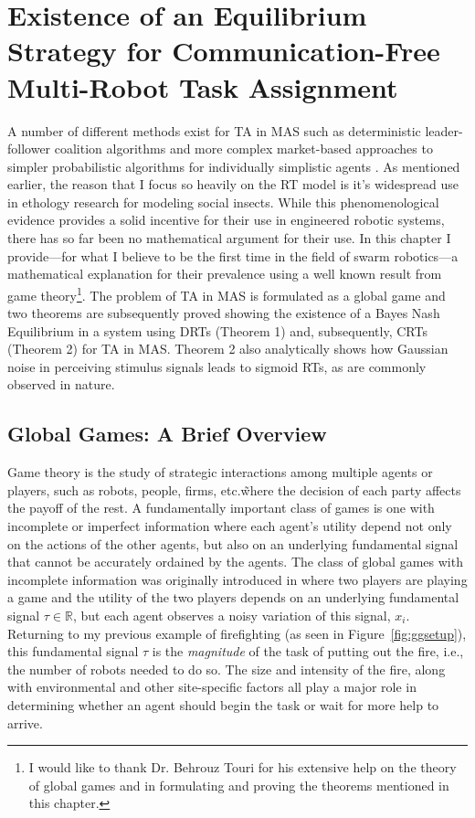 \documentclass[defaultstyle,12pt]{thesis}
\begin{document}
\chapter{Existence of an Equilibrium Strategy for Communication-Free Multi-Robot Task Assignment}\label{ch:existeqrtm}
A number of different methods exist for TA in MAS such as deterministic leader-follower coalition algorithms \cite{Chen2011} and more complex market-based approaches \cite{Amstutz2008} to simpler probabilistic algorithms for individually simplistic agents \cite{Dantu2012}. As mentioned earlier, the reason that I focus so heavily on the RT model is it's widespread use in ethology research for modeling social insects. While this phenomenological evidence provides a solid incentive for their use in engineered robotic systems, there has so far been no mathematical argument for their use. In this chapter I provide---for what I believe to be the first time in the field of swarm robotics---a mathematical explanation for their prevalence using a well known result from game theory\footnote{I would like to thank Dr. Behrouz Touri for his extensive help on the theory of global games and in formulating and proving the theorems mentioned in this chapter.}. The problem of TA in MAS is formulated as a global game and two theorems are subsequently proved showing the existence of a Bayes Nash Equilibrium in a system using DRTs (Theorem 1) and, subsequently, CRTs (Theorem 2) for TA in MAS. Theorem 2 also analytically shows how Gaussian noise in perceiving stimulus signals leads to sigmoid RTs, as are commonly observed in nature.

\section{Global Games: A Brief Overview}\label{sec:ggoverview}
Game theory is the study of strategic interactions among multiple agents or players, such as robots, people, firms, etc.\~where the decision of each party affects the payoff of the rest. A fundamentally important class of games is one with incomplete or imperfect information where each agent's utility depend not only on the actions of the other agents, but also on an underlying fundamental signal that cannot be accurately ordained by the agents. The class of global games with incomplete information was originally introduced in \cite{Carlsson1993} where two players are playing a game and the utility of the two players depends on an underlying fundamental signal $\tau \in \mathbb{R}$, but each agent observes a noisy variation of this signal, $x_i$. Returning to my previous example of firefighting (as seen in Figure~\ref{fig:ggsetup}), this fundamental signal $\tau$ is the \emph{magnitude} of the task of putting out the fire, i.e., the number of robots needed to do so. The size and intensity of the fire, along with environmental and other site-specific factors all play a major role in determining whether an agent should begin the task or wait for more help to arrive.
\end{document}
